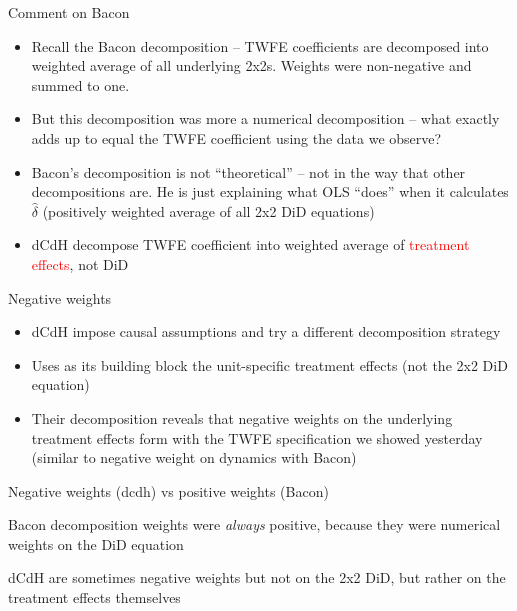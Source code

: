 \documentclass{beamer}
\begin{document}
\begin{frame}{Comment on Bacon}

\begin{itemize}
\item Recall the Bacon decomposition -- TWFE coefficients are decomposed into weighted average of all underlying 2x2s. Weights were non-negative and summed to one.
\item But this decomposition was more a numerical decomposition -- what exactly adds up to equal the TWFE coefficient using the data we observe?
\item Bacon's decomposition is not ``theoretical'' -- not in the way that other decompositions are. He is just explaining what OLS ``does'' when it calculates $\widehat{\delta}$ (positively weighted average of all 2x2 DiD equations)
\item dCdH decompose TWFE coefficient into weighted average of \textcolor{red}{treatment effects}, not DiD
\end{itemize}

\end{frame}

\begin{frame}{Negative weights}

\begin{itemize}
\item dCdH impose causal assumptions and try a different decomposition strategy
\item Uses as its building block the unit-specific treatment effects (not the 2x2 DiD equation)
\item Their decomposition reveals that negative weights on the underlying treatment effects form with the TWFE specification we showed yesterday (similar to negative weight on dynamics with Bacon)
\end{itemize}

\end{frame}

\begin{frame}{Negative weights (dcdh) vs positive weights (Bacon)}

 Bacon decomposition weights were \emph{always} positive, because they were numerical weights on the DiD equation
 
 \bigskip
 
 dCdH are sometimes negative weights but not on the 2x2 DiD, but rather on the treatment effects themselves

\end{frame}
\end{document}
